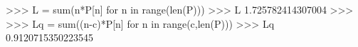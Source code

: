 
>>> L = sum(n*P[n] for n in range(len(P)))
>>> L
1.725782414307004
>>>
>>> Lq = sum((n-c)*P[n] for n in range(c,len(P)))
>>> Lq
0.9120715350223545

